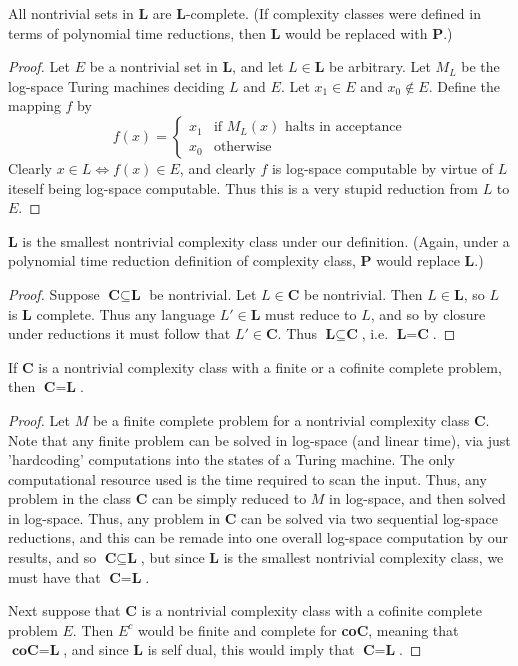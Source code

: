 \begin{lemma}
	All nontrivial sets in \textbf{L} are \textbf{L}-complete. (If complexity classes were defined in terms of polynomial time reductions, then \textbf{L} would be replaced with \textbf{P}.)
\end{lemma}
\begin{proof}
	Let $E$ be a nontrivial set in \textbf{L}, and let $L \in \textbf{L}$ be arbitrary. Let $M_L$ be the log-space Turing machines deciding $L$ and $E$. Let $x_1 \in E$ and $x_0 \notin E$. Define the mapping $f$ by
	\[ f(x) = \begin{cases}
			  	x_1 & \textrm{if $M_L(x)$ halts in acceptance} \\
			  	x_0 & \textrm{otherwise}
			  \end{cases} \] 
Clearly $x \in L \iff f(x) \in E$, and clearly $f$ is log-space computable by virtue of $L$ iteself being log-space computable. Thus this is a very stupid reduction from $L$ to $E$. 
\end{proof}
\begin{lemma}
	\textbf{L} is the smallest nontrivial complexity class under our definition. (Again, under a polynomial time reduction definition of complexity class, \textbf{P} would replace \textbf{L}.)
\end{lemma}
\begin{proof}
	Suppose $\textbf{C} \subseteq \textbf{L}$ be nontrivial. Let $L \in \textbf{C}$ be nontrivial. Then $L \in \textbf{L}$, so $L$ is \textbf{L} complete. Thus any language $L' \in \textbf{L}$ must reduce to $L$, and so by closure under reductions it must follow that $L' \in \textbf{C}$. Thus $\textbf{L} \subseteq \textbf{C}$, i.e. $\textbf{L} = \textbf{C}$.
\end{proof}
\begin{lemma}
 If $\textbf{C}$ is a nontrivial complexity class with a finite or a cofinite complete problem, then $\textbf{C} = \textbf{L}$. 
\end{lemma}
\begin{proof}
	Let $M$ be a finite complete problem for a nontrivial complexity class \textbf{C}. Note that any finite problem can be solved in log-space (and linear time), via just 'hardcoding' computations into the states of a Turing machine. The only computational resource used is the time required to scan the input. Thus, any problem in the class \textbf{C} can be simply reduced to $M$ in log-space, and then solved in log-space. Thus, any problem in $\textbf{C}$ can be solved via two sequential log-space reductions, and this can be remade into one overall log-space computation by our results, and so $\textbf{C} \subseteq \textbf{L}$, but since \textbf{L} is the smallest nontrivial complexity class, we must have that $\textbf{C} = \textbf{L}$.
	\par Next suppose that \textbf{C} is a nontrivial complexity class with a cofinite complete problem $E$. Then $E^c$ would be finite and complete for \textbf{coC}, meaning that $\textbf{coC} = \textbf{L}$, and since $\textbf{L}$ is self dual, this would imply that $\textbf{C} = \textbf{L}$.
\end{proof}
